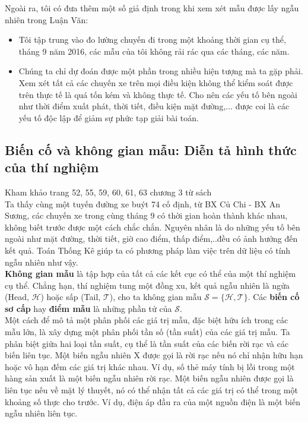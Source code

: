 \documentclass[a4paper, 13pt]{report}
\begin{document}
Ngoài ra, tôi có đưa thêm một số giả định trong khi xem xét mẫu được lấy ngẫu nhiên trong Luận Văn: 
\begin{itemize}
\item Tôi tập trung vào đo lường chuyến đi trong một khoảng thời gian cụ thể, tháng 9 năm 2016, các mẫu của tôi không rải rác qua các tháng, các năm. 
\item  Chúng ta chỉ dự đoán được một phần trong nhiều hiện tượng mà ta gặp phải. Xem xét tất cả các chuyến xe trên mọi điều kiện không thể kiểm soát được trên thực tế là quá tốn kém và không thực tế. Cho nên các yếu tố bên ngoài như thời điểm xuất phát, thời tiết, điều kiện mặt đường,... được coi là các yếu tố độc lập để giảm sự phức tạp giải bài toán.
\end{itemize}  
\subsection*{Biến cố và không gian mẫu: Diễn tả hình thức của thí nghiệm}
Kham khảo trang 52, 55, 59, 60, 61, 63 chương 3 từ sách \cite{TKCNUDR}\\
Ta thấy cùng một tuyến đường xe buýt 74 cố định, từ BX Củ Chi - BX An Sương, các chuyến xe trong cùng tháng 9 có thời gian hoàn thành khác nhau, không biết trước được một cách chắc chắn. Nguyên nhân là do những yếu tố bên ngoài như mặt đường, thời tiết, giờ cao điểm, thấp điểm,..đều có ảnh hưởng đến kết quả. Toán Thống Kê giúp ta có phương pháp làm việc trên dữ  liệu có tính ngẫu nhiên như vậy.\\
\textbf{Không gian mẫu} là tập hợp của tất cả các kết cục có thể của một thí nghiệm cụ thể. Chẳng hạn, thí nghiệm tung một đồng xu, kết quả ngẫu nhiên là ngửa (Head, $\mathcal{H}$) hoặc sấp (Tail, $\mathcal{T}$), cho ta không gian mẫu $\mathcal{S= \{H,T}\}$. Các \textbf{biến cố sơ cấp} hay \textbf{điểm mẫu} là những phần tử của $\mathcal{S}$.\\
Một cách để mô tả một phân phối các giá trị mẫu, đặc biệt hữu ích trong các mẫu lớn, là xây dựng một phân phối tần số (tần suất) của các giá trị mẫu. Ta phân biệt giữa hai loại tần suất, cụ thể là tần suất của các biến rời rạc và các biến liên tục. Một biến ngẫu nhiên X được gọi là rời rạc nếu nó chỉ nhận hữu hạn hoặc vô hạn đếm các giá trị khác nhau. Ví dụ, số thẻ máy tính bị lỗi trong một hàng sản xuất là một biến ngẫu nhiên rời rạc. Một biến ngẫu nhiên được gọi là liên tục nếu về mặt lý thuyết, nó có thể nhận tất cả các giá trị có thể trong một khoảng số thực cho trước. Ví dụ, điện áp đầu ra của một nguồn điện là một biến ngẫu nhiên liên tục.
\end{document}

